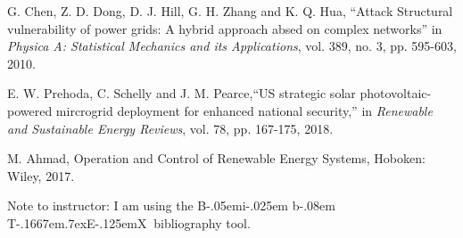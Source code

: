 \documentclass[letterpaper,conference]{IEEEtran}
\def\BibTeX{{\rm B\kern-.05em{\sc i\kern-.025em b}\kern-.08em
    T\kern-.1667em\lower.7ex\hbox{E}\kern-.125emX}}
\begin{document}
\begin{thebibliography}{1}

G. Chen, Z. D. Dong, D. J. Hill, G. H. Zhang and K. Q. Hua, ``Attack Structural vulnerability of power grids: A hybrid approach absed on complex networks'' in \textit{Physica A: Statistical Mechanics and its Applications}, vol. 389, no. 3, pp. 595-603, 2010. 

E. W. Prehoda, C. Schelly and J. M. Pearce,``US strategic solar photovoltaic-powered mircrogrid deployment for enhanced national security,'' in \textit{Renewable and Sustainable Energy Reviews}, vol. 78, pp. 167-175, 2018. 

M. Ahmad, Operation and Control of Renewable Energy Systems, Hoboken: Wiley, 2017. 

\end{thebibliography}
Note to instructor: I am using the \BibTeX $\:$ bibliography tool.
\end{document}
